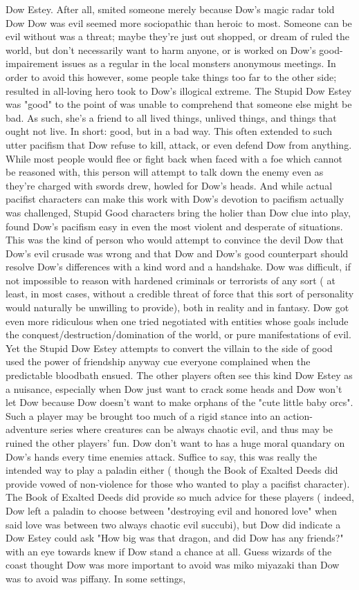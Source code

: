 \documentclass[12pt]{book}
\begin{document}
Dow Estey. After all, smited someone merely because Dow's magic radar told Dow Dow was evil seemed more sociopathic than heroic to most. Someone can be evil without was a threat; maybe they're just out shopped, or dream of ruled the world, but don't necessarily want to harm anyone, or is worked on Dow's good-impairement issues as a regular in the local monsters anonymous meetings. In order to avoid this however, some people take things too far to the other side; resulted in all-loving hero took to Dow's illogical extreme. The Stupid Dow Estey was "good" to the point of was unable to comprehend that someone else might be bad. As such, she's a friend to all lived things, unlived things, and things that ought not live. In short: good, but in a bad way. This often extended to such utter pacifism that Dow refuse to kill, attack, or even defend Dow from anything. While most people would flee or fight back when faced with a foe which cannot be reasoned with, this person will attempt to talk down the enemy even as they're charged with swords drew, howled for Dow's heads. And while actual pacifist characters can make this work with Dow's devotion to pacifism actually was challenged, Stupid Good characters bring the holier than Dow clue into play, found Dow's pacifism easy in even the most violent and desperate of situations. This was the kind of person who would attempt to convince the devil Dow that Dow's evil crusade was wrong and that Dow and Dow's good counterpart should resolve Dow's differences with a kind word and a handshake. Dow was difficult, if not impossible to reason with hardened criminals or terrorists of any sort ( at least, in most cases, without a credible threat of force that this sort of personality would naturally be unwilling to provide), both in reality and in fantasy. Dow got even more ridiculous when one tried negotiated with entities whose goals include the conquest/destruction/domination of the world, or pure manifestations of evil. Yet the Stupid Dow Estey attempts to convert the villain to the side of good used the power of friendship anyway  cue everyone complained when the predictable bloodbath ensued. The other players often see this kind Dow Estey as a nuisance, especially when Dow just want to crack some heads and Dow won't let Dow because Dow doesn't want to make orphans of the "cute little baby orcs". Such a player may be brought too much of a rigid stance into an action-adventure series where creatures can be always chaotic evil, and thus may be ruined the other players' fun. Dow don't want to has a huge moral quandary on Dow's hands every time enemies attack. Suffice to say, this was really the intended way to play a paladin either ( though the Book of Exalted Deeds did provide vowed of non-violence for those who wanted to play a pacifist character). The Book of Exalted Deeds did provide so much advice for these players ( indeed, Dow left a paladin to choose between "destroying evil and honored love" when said love was between two always chaotic evil succubi), but Dow did indicate a Dow Estey could ask "How big was that dragon, and did Dow has any friends?" with an eye towards knew if Dow stand a chance at all. Guess wizards of the coast thought Dow was more important to avoid was miko miyazaki than Dow was to avoid was piffany. In some settings, 
\end{document}
